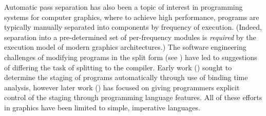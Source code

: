 Automatic pass separation has also been a topic of interest in
programming systems for computer graphics, where to achieve
high performance, programs are typically manually separated into
components by frequency of execution. (Indeed, separation into a pre-determined
set of per-frequency modules is \emph{required} by the execution model
of modern graphics architectures.)  
The software engineering challenges of modifying programs in the split form (see \cite{Foley:2011}) have led to
suggestions of differing the task of splitting to the compiler.
Early work (\cite{knoblock96}) sought to determine the staging of programs automatically through use of binding time analysis,
however later work (\cite{Proudfoot:2001,Foley:2011,He:2014}) has focused on giving programmers explicit control of the staging through 
programming language features. 
All of these efforts in graphics have been limited to simple, imperative languages. 





